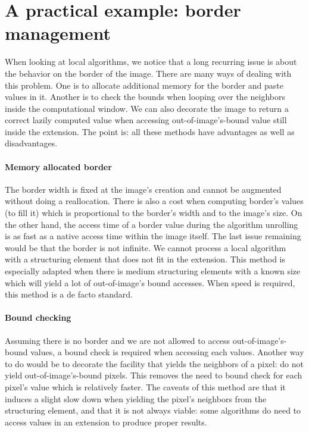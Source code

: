 \section{A practical example: border management}

\label{sec:border.management}

When looking at local algorithms, we notice that a long recurring issue is about the behavior on the border of the
image. There are many ways of dealing with this problem. One is to allocate additional memory for the border and paste
values in it. Another is to check the bounds when looping over the neighbors inside the computational window. We can
also decorate the image to return a correct lazily computed value when accessing out-of-image's-bound value still inside
the extension. The point is: all these methods have advantages as well as disadvantages.

\paragraph{Memory allocated border}
The border width is fixed at the image's creation and cannot be augmented without doing a reallocation. There is also a
cost when computing border's values (to fill it) which is proportional to the border's width and to the image's size. On
the other hand, the access time of a border value during the algorithm unrolling is as fast as a native access time
within the image itself. The last issue remaining would be that the border is not infinite. We cannot process a local
algorithm with a structuring element that does not fit in the extension. This method is especially adapted when there is
medium structuring elements with a known size which will yield a lot of out-of-image's bound accesses. When speed is
required, this method is a de facto standard.

\paragraph{Bound checking}
Assuming there is no border and we are not allowed to access out-of-image's-bound values, a bound check is required when
accessing each values. Another way to do would be to decorate the facility that yields the neighbors of a pixel: do not
yield out-of-image's-bound pixels. This removes the need to bound check for each pixel's value which is relatively
faster. The caveats of this method are that it induces a slight slow down when yielding the pixel's neighbors from the
structuring element, and that it is not always viable: some algorithms do need to access values in an extension to
produce proper results.

